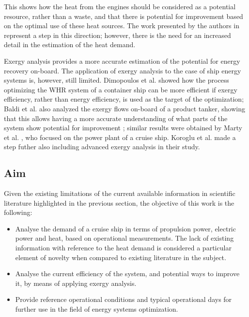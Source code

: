 \documentclass[preprint,12pt]{elsarticle}
\begin{document}
This shows how the heat from the engines should be considered as a potential resource, rather than a waste, and that there is potential for improvement based on the optimal use of these heat sources. The work presented by the authors in \cite{Baldi2016} represent a step in this direction; however, there is the need for an increased detail in the estimation of the heat demand. 

Exergy analysis provides a more accurate estimation of the potential for energy recovery on-board. The application of exergy analysis to the case of ship energy systems is, however, still limited. Dimopoulos et al. \cite{Dimopoulos2012} showed how the process optimizing the WHR system of a container ship can be more efficient if exergy efficiency, rather than energy efficiency, is used as the target of the optimization; Baldi et al. \cite{Baldi2015a} also analyzed the exergy flows on-board of a product tanker, showing that this allows having a more accurate understanding of what parts of the system show potential for improvement ; similar results were obtained by Marty et al. \cite{Marty2016}, who focused on the power plant of a cruise ship. Koroglu et al. \cite{Koroglu2017} made a step futher also including advanced exergy analysis in their study.



\subsection{Aim}

Given the existing limitations of the current available information in scientific literature highlighted in the previous section, the objective of this work is the following:
\begin{itemize}
	\item Analyse the demand of a cruise ship in terms of propulsion power, electric power and heat, based on operational measurements. The lack of existing information with reference to the heat demand is considered a particular element of novelty when compared to existing literature in the subject.
	\item Analyse the current efficiency of the system, and potential ways to improve it, by means of applying exergy analysis.
	\item Provide reference operational conditions and typical operational days for further use in the field of energy systems optimization.
\end{itemize}
\end{document}
